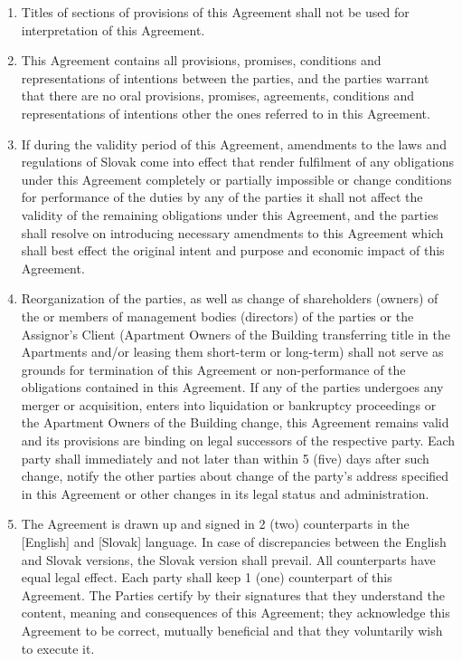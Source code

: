 \documentclass[a4paper]{article}
\begin{document}
\begin{multicols}{2}
\begin{enumerate}
  \item{Titles of sections of provisions of this Agreement shall not
      be used for interpretation of this Agreement.}

  \item{This Agreement contains all provisions, promises, conditions
      and representations of intentions between the parties, and the
      parties warrant that there are no oral provisions, promises,
      agreements, conditions and representations of intentions other
      the ones referred to in this Agreement.}

  \item{If during the validity period of this Agreement, amendments to
      the laws and regulations of Slovak come into effect that render
      fulfilment of any obligations under this Agreement completely or
      partially impossible or change conditions for performance of the
      duties by any of the parties it shall not affect the validity of
      the remaining obligations under this Agreement, and the parties
      shall resolve on introducing necessary amendments to this
      Agreement which shall best effect the original intent and
      purpose and economic impact of this Agreement. }

  \item{Reorganization of the parties, as well as change of
      shareholders (owners) of the or members of management bodies
      (directors) of the parties or the Assignor's Client (Apartment
      Owners of the Building transferring title in the Apartments
      and/or leasing them short{-}term or long{-}term) shall not serve
      as grounds for termination of this Agreement or
      non{-}performance of the obligations contained in this
      Agreement. If any of the parties undergoes any merger or
      acquisition, enters into liquidation or bankruptcy proceedings
      or the Apartment Owners of the Building change, this Agreement
      remains valid and its provisions are binding on legal successors
      of the respective party. Each party shall immediately and not
      later than within 5 (five) days after such change, notify the
      other parties about change of the party’s address specified in
      this Agreement or other changes in its legal status and
      administration.}

  \item{The Agreement is drawn up and signed in 2 (two) counterparts
      in the {[}English{]} and {[}Slovak{]} language. In case of
      discrepancies between the English and Slovak versions, the
      Slovak version shall prevail. All counterparts have equal legal
      effect. Each party shall keep 1 (one) counterpart of this
      Agreement. The Parties certify by their signatures that they
      understand the content, meaning and consequences of this
      Agreement; they acknowledge this Agreement to be correct,
      mutually beneficial and that they voluntarily wish to execute
      it. }
  \end{enumerate}


\end{multicols}
\end{document}

